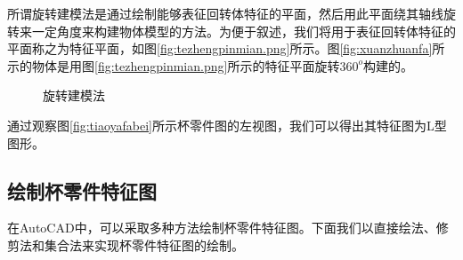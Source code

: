 所谓旋转建模法是通过绘制能够表征回转体特征的平面，然后用此平面绕其轴线旋转来一定角度来构建物体模型的方法。为便于叙述，我们将用于表征回转体特征的平面称之为特征平面，如图\ref{fig:tezhengpinmian.png}所示。图\ref{fig:xuanzhuanfa}所示的物体是用图\ref{fig:tezhengpinmian.png}所示的特征平面旋转$360^o$构建的。
\begin{figure}[htbp]
\hspace{60pt}
\caption{旋转建模法}
\end{figure}
通过观察图\ref{fig:tiaoyafabei}所示杯零件图的左视图，我们可以得出其特征图为L型图形。
\subsection{绘制杯零件特征图}\label{sec:beilingjiantezheng}
在AutoCAD中，可以采取多种方法绘制杯零件特征图。下面我们以直接绘法、修剪法和集合法来实现杯零件特征图的绘制。
